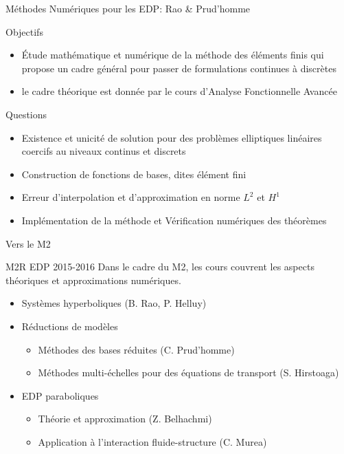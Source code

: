 \documentclass{beamer}
\begin{document}
\begin{frame}{Méthodes Numériques pour les EDP: Rao \& Prud'homme}
  \begin{block}{Objectifs}
    \begin{itemize}
    \item Étude mathématique et numérique de la méthode des éléments
      finis qui propose un cadre général pour passer de formulations
      continues à discrètes
    \item le cadre théorique est donnée par le cours d'Analyse
      Fonctionnelle Avancée
    \end{itemize}
  \end{block}
  \begin{block}{Questions}
    \begin{itemize}
    \item Existence et unicité de solution pour des problèmes
      elliptiques linéaires coercifs au niveaux continus et discrets
    \item Construction de fonctions de bases, dites élément fini
    \item Erreur d'interpolation et d'approximation en norme $L^2$ et $H^1$
    \item Implémentation de la méthode et Vérification numériques des théorèmes
    \end{itemize}
  \end{block}
\end{frame}

\begin{frame}{Vers le M2}

  \begin{block}{M2R EDP 2015-2016}
    Dans le cadre du M2, les cours couvrent les aspects théoriques et
    approximations numériques.
    \begin{itemize}
    \item Systèmes hyperboliques (B. Rao, P. Helluy)
    \item Réductions de modèles
      \begin{itemize}
      \item Méthodes des bases réduites (C. Prud'homme)
      \item Méthodes multi-échelles pour des équations de transport (S. Hirstoaga)
      \end{itemize}
    \item EDP paraboliques
      \begin{itemize}
      \item Théorie et approximation (Z. Belhachmi)
      \item Application à l'interaction
        fluide-structure (C. Murea)
      \end{itemize}
    \end{itemize}
  \end{block}

\end{frame}
\end{document}
